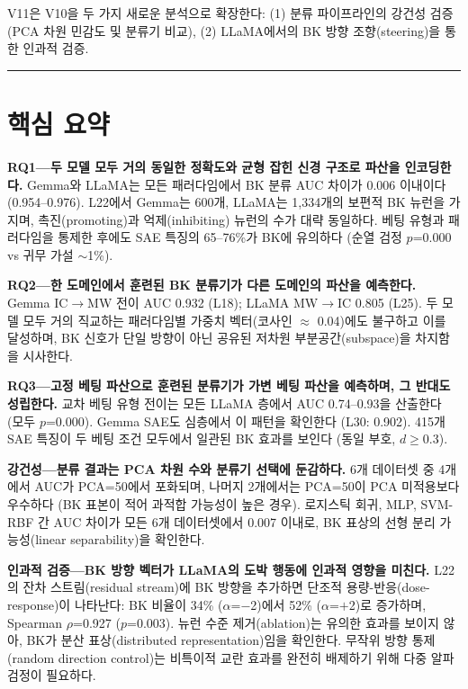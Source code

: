 \documentclass[11pt,a4paper]{article}
\begin{document}
V11은 V10을 두 가지 새로운 분석으로 확장한다: (1) 분류 파이프라인의 강건성 검증(PCA 차원 민감도 및 분류기 비교), (2) LLaMA에서의 BK 방향 조향(steering)을 통한 인과적 검증.

\bigskip\hrule\bigskip

\section*{핵심 요약}

\textbf{RQ1---두 모델 모두 거의 동일한 정확도와 균형 잡힌 신경 구조로 파산을 인코딩한다.} Gemma와 LLaMA는 모든 패러다임에서 BK 분류 AUC 차이가 0.006 이내이다 (0.954--0.976). L22에서 Gemma는 600개, LLaMA는 1{,}334개의 보편적 BK 뉴런을 가지며, 촉진(promoting)과 억제(inhibiting) 뉴런의 수가 대략 동일하다. 베팅 유형과 패러다임을 통제한 후에도 SAE 특징의 65--76\%가 BK에 유의하다 (순열 검정 $p$=0.000 vs 귀무 가설 ${\sim}$1\%).

\textbf{RQ2---한 도메인에서 훈련된 BK 분류기가 다른 도메인의 파산을 예측한다.} Gemma IC$\rightarrow$MW 전이 AUC 0.932 (L18); LLaMA MW$\rightarrow$IC 0.805 (L25). 두 모델 모두 거의 직교하는 패러다임별 가중치 벡터(코사인 $\approx$ 0.04)에도 불구하고 이를 달성하며, BK 신호가 단일 방향이 아닌 공유된 저차원 부분공간(subspace)을 차지함을 시사한다.

\textbf{RQ3---고정 베팅 파산으로 훈련된 분류기가 가변 베팅 파산을 예측하며, 그 반대도 성립한다.} 교차 베팅 유형 전이는 모든 LLaMA 층에서 AUC 0.74--0.93을 산출한다 (모두 $p$=0.000). Gemma SAE도 심층에서 이 패턴을 확인한다 (L30: 0.902). 415개 SAE 특징이 두 베팅 조건 모두에서 일관된 BK 효과를 보인다 (동일 부호, $d$$\geq$0.3).

\textbf{강건성---분류 결과는 PCA 차원 수와 분류기 선택에 둔감하다.} 6개 데이터셋 중 4개에서 AUC가 PCA=50에서 포화되며, 나머지 2개에서는 PCA=50이 PCA 미적용보다 우수하다 (BK 표본이 적어 과적합 가능성이 높은 경우). 로지스틱 회귀, MLP, SVM-RBF 간 AUC 차이가 모든 6개 데이터셋에서 0.007 이내로, BK 표상의 선형 분리 가능성(linear separability)을 확인한다.

\textbf{인과적 검증---BK 방향 벡터가 LLaMA의 도박 행동에 인과적 영향을 미친다.} L22의 잔차 스트림(residual stream)에 BK 방향을 추가하면 단조적 용량-반응(dose-response)이 나타난다: BK 비율이 34\% ($\alpha$=$-$2)에서 52\% ($\alpha$=$+$2)로 증가하며, Spearman $\rho$=0.927 ($p$=0.003). 뉴런 수준 제거(ablation)는 유의한 효과를 보이지 않아, BK가 분산 표상(distributed representation)임을 확인한다. 무작위 방향 통제(random direction control)는 비특이적 교란 효과를 완전히 배제하기 위해 다중 알파 검정이 필요하다.
\end{document}
